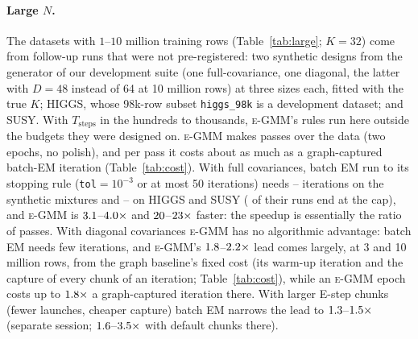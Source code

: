 \documentclass[10pt]{article} %
\newcommand{\egmm}{\textsc{e-GMM}}
\begin{document}
\paragraph{Large $N$.} The \rSnLg{} datasets with $1$--$10$ million training rows (Table~\ref{tab:large}; $K = 32$) come from follow-up runs that were not pre-registered: two synthetic designs from the generator of our development suite (one full-covariance, one diagonal, the latter with $D = 48$ instead of 64 at 10 million rows) at three sizes each, fitted with the true $K$; HIGGS, whose 98k-row subset \texttt{higgs\_98k} is a development dataset; and SUSY. With $T_{\mathrm{steps}}$ in the hundreds to thousands, \egmm{}'s rules run here outside the budgets they were designed on. \egmm{} makes \rSLgEGMMPasses{} passes over the data (two epochs, no polish), and per pass it costs about as much as a graph-captured batch-EM iteration (Table~\ref{tab:cost}). With full covariances, batch EM run to its stopping rule (\texttt{tol}$=10^{-3}$ or at most 50 iterations) needs \rSLgTBIterSynMin--\rSLgTBIterSynMax{} iterations on the synthetic mixtures and \rSLgTBIterHiggsMin--\rSLgTBIterSusy{} on HIGGS and SUSY (\rSLgCapRuns{} of their \rSLgRealRuns{} runs end at the cap), and \egmm{} is $3.1$--$4.0\times$ and $20$--$23\times$ faster: the speedup is essentially the ratio of passes. With diagonal covariances \egmm{} has no algorithmic advantage: batch EM needs few iterations, and \egmm{}'s $1.8$--$2.2\times$ lead comes largely, at 3 and 10 million rows, from the graph baseline's fixed cost (its warm-up iteration and the capture of every chunk of an iteration; Table~\ref{tab:cost}), while an \egmm{} epoch costs up to $1.8\times$ a graph-captured iteration there. With larger E-step chunks (fewer launches, cheaper capture) batch EM narrows the lead to $1.3$--$1.5\times$ (separate session; $1.6$--$3.5\times$ with default chunks there).
\end{document}
